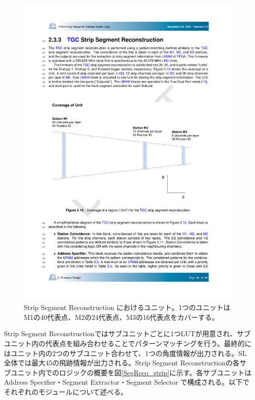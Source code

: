 \begin{figure} 
    \centering
    \includegraphics[width=12cm]{fig/SL/StationCoin_unit_strip.pdf}
    \caption[Strip Segment Reconstruction におけるユニット]{Strip Segment Reconstruction におけるユニット\cite{SLPDR}。1つのユニットはM1の40代表点、M2の24代表点、M3の16代表点をカバーする。}
    \label{StationCoin_unit_strip}
\end{figure}

Strip Segment Reconstructionではサブユニットごとに1つLUTが用意され、サブユニット内の代表点を組み合わせることでパターンマッチングを行う。最終的にはユニット内の2つのサブユニット合わせて、1つの角度情報が出力される。SL全体では最大45の飛跡情報が出力される。Strip Segment Reconstructionの各サブユニット内でのロジックの概要を図\ref{SegReco_strip}に示す。各サブユニットはAddress Specifier・Segment Extractor・Segment Selector で構成される。以下でそれぞれのモジュールについて述べる。

